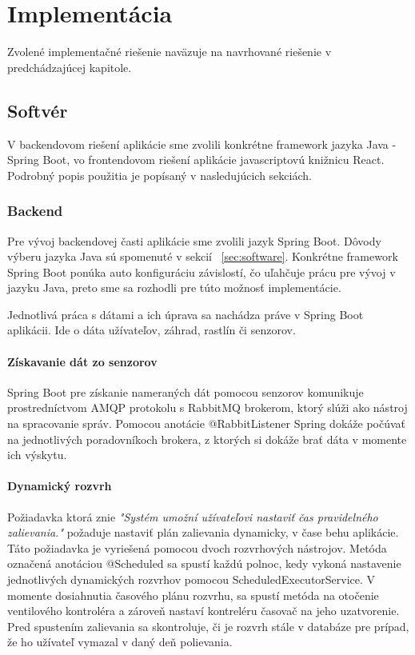 \documentclass[twoside]{ctuthesis}
\theoremstyle{plain}
\theoremstyle{definition}
\theoremstyle{note}
\begin{document}
\chapter{Implementácia}
Zvolené implementačné riešenie naväzuje na navrhované riešenie v predchádzajúcej kapitole.

\section{Softvér}
V backendovom riešení aplikácie sme zvolili konkrétne framework jazyka Java - Spring Boot, vo frontendovom riešení aplikácie javascriptovú knižnicu React. Podrobný popis použitia je popísaný v nasledujúcich sekciách.

\subsection{Backend}
Pre vývoj backendovej časti aplikácie sme zvolili jazyk Spring Boot. Dôvody výberu jazyka Java sú spomenuté v sekcií ~\ref{sec:software}. Konkrétne framework Spring Boot ponúka auto konfiguráciu závislostí, čo uľahčuje prácu pre vývoj v jazyku Java, preto sme sa rozhodli pre túto možnosť implementácie.

Jednotlivá práca s dátami a ich úprava sa nachádza práve v Spring Boot aplikácii. Ide o dáta užívateľov, záhrad, rastlín či senzorov. 

\subsubsection{Získavanie dát zo senzorov}
Spring Boot pre získanie nameraných dát pomocou senzorov komunikuje prostredníctvom AMQP protokolu s RabbitMQ brokerom, ktorý slúži ako nástroj na spracovanie správ. Pomocou anotácie  \textsf{@RabbitListener} Spring dokáže počúvať na jednotlivých poradovníkoch brokera, z ktorých si dokáže brať dáta v momente ich výskytu.

\subsubsection{Dynamický rozvrh}
Požiadavka ktorá znie \textit{"Systém umožní užívateľovi nastaviť čas pravidelného zalievania."} požaduje nastaviť plán zalievania dynamicky, v čase behu aplikácie. Táto požiadavka je vyriešená pomocou dvoch rozvrhových nástrojov. Metóda označená anotáciou \textsf{@Scheduled} sa spustí každú polnoc, kedy vykoná nastavenie jednotlivých dynamických rozvrhov pomocou \textsf{ScheduledExecutorService}. V momente dosiahnutia časového plánu rozvrhu, sa spustí metóda na otočenie ventilového kontroléra a zároveň nastaví kontreléru časovač na jeho uzatvorenie. Pred spustením zalievania sa skontroluje, či je rozvrh stále v databáze pre prípad, že ho užívateľ vymazal v daný deň polievania.
\end{document}
